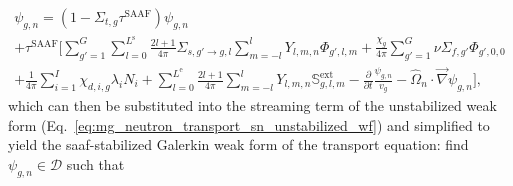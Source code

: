 \begin{multline}\label{eq:void_angular_flux_eq}
    \psi_{g,n} = (1 - \Sigma_{t,g}\tau^{\text{SAAF}})\psi_{g,n}\\
    + \tau^{\text{SAAF}}\Bigg[
    \sum_{g' = 1}^{G}\sum_{l = 0}^{L^{\text{s}}}\frac{2l + 1}{4\pi}\Sigma_{s, g'\rightarrow g, l}\sum_{m = -l}^{l} Y_{l,m,n}\Phi_{g', l, m}
    + \frac{\chi_{g}}{4\pi}\sum_{g' = 1}^{G} \nu\Sigma_{f,g'}\Phi_{g',0,0}\\
    + \frac{1}{4\pi}\sum_{i = 1}^{I} \chi_{d,i,g}\lambda_{i}N_{i} + \sum_{l = 0}^{L^{\text{e}}} \frac{2l + 1}{4\pi} \sum_{m = -l}^{l}Y_{l,m,n}\mathbb{S}^{\text{ext}}_{g,l,m}
    - \frac{\partial}{\partial t}\frac{\psi_{g,n}}{v_{g}} 
    - \hat{\Omega}_{n}\cdot\vec{\nabla}\psi_{g,n}
    \Bigg] \text{,}
\end{multline}
which can then be substituted into the streaming term of the unstabilized weak form (Eq.~\ref{eq:mg_neutron_transport_sn_unstabilized_wf}) and simplified to yield the \acrshort{saaf}-stabilized Galerkin weak form of the transport equation: find $\psi_{g,n}\in \mathcal{D}$ such that
